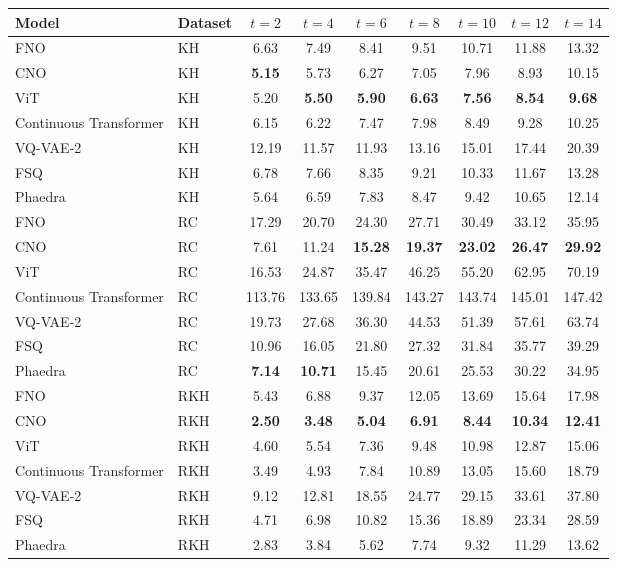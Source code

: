\begin{tabular}{llccccccc}
\toprule
Model & Dataset & $t=2$ & $t=4$ & $t=6$ & $t=8$ & $t=10$ & $t=12$ & $t=14$ \\
\midrule
FNO & KH & 6.63 & 7.49 & 8.41 & 9.51 & 10.71 & 11.88 & 13.32 \\
CNO & KH & \textbf{5.15} & 5.73 & 6.27 & 7.05 & 7.96 & 8.93 & 10.15 \\
ViT & KH & 5.20 & \textbf{5.50} & \textbf{5.90} & \textbf{6.63} & \textbf{7.56} & \textbf{8.54} & \textbf{9.68} \\
Continuous Transformer & KH & 6.15 & 6.22 & 7.47 & 7.98 & 8.49 & 9.28 & 10.25 \\
VQ-VAE-2 & KH & 12.19 & 11.57 & 11.93 & 13.16 & 15.01 & 17.44 & 20.39 \\
FSQ & KH & 6.78 & 7.66 & 8.35 & 9.21 & 10.33 & 11.67 & 13.28 \\
Phaedra & KH & 5.64 & 6.59 & 7.83 & 8.47 & 9.42 & 10.65 & 12.14 \\
\midrule
FNO & RC & 17.29 & 20.70 & 24.30 & 27.71 & 30.49 & 33.12 & 35.95 \\
CNO & RC & 7.61 & 11.24 & \textbf{15.28} & \textbf{19.37} & \textbf{23.02} & \textbf{26.47} & \textbf{29.92} \\
ViT & RC & 16.53 & 24.87 & 35.47 & 46.25 & 55.20 & 62.95 & 70.19 \\
Continuous Transformer & RC & 113.76 & 133.65 & 139.84 & 143.27 & 143.74 & 145.01 & 147.42 \\
VQ-VAE-2 & RC & 19.73 & 27.68 & 36.30 & 44.53 & 51.39 & 57.61 & 63.74 \\
FSQ & RC & 10.96 & 16.05 & 21.80 & 27.32 & 31.84 & 35.77 & 39.29 \\
Phaedra & RC & \textbf{7.14} & \textbf{10.71} & 15.45 & 20.61 & 25.53 & 30.22 & 34.95 \\
\midrule
FNO & RKH & 5.43 & 6.88 & 9.37 & 12.05 & 13.69 & 15.64 & 17.98 \\
CNO & RKH & \textbf{2.50} & \textbf{3.48} & \textbf{5.04} & \textbf{6.91} & \textbf{8.44} & \textbf{10.34} & \textbf{12.41} \\
ViT & RKH & 4.60 & 5.54 & 7.36 & 9.48 & 10.98 & 12.87 & 15.06 \\
Continuous Transformer & RKH & 3.49 & 4.93 & 7.84 & 10.89 & 13.05 & 15.60 & 18.79 \\
VQ-VAE-2 & RKH & 9.12 & 12.81 & 18.55 & 24.77 & 29.15 & 33.61 & 37.80 \\
FSQ & RKH & 4.71 & 6.98 & 10.82 & 15.36 & 18.89 & 23.34 & 28.59 \\
Phaedra & RKH & 2.83 & 3.84 & 5.62 & 7.74 & 9.32 & 11.29 & 13.62 \\
\bottomrule
\end{tabular}
